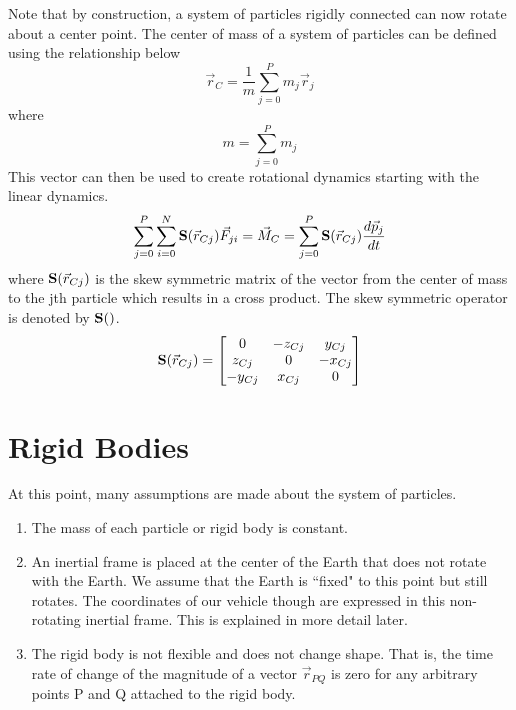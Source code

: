 \documentclass{article}
\begin{document}
Note that by construction, a system of particles rigidly connected can
now rotate about a center point. The center of mass of a system of
particles can be defined using the relationship below
\begin{equation}
\vec{r}_C = \frac{1}{m}\sum\limits_{j=0}^P m_j\vec{r}_{j}
\end{equation}
where
\begin{equation}
m = \sum\limits_{j=0}^P m_j
\end{equation}
This vector can then be used to create rotational dynamics starting
with the linear dynamics.
\begin{equation}
\sum\limits_{j=0}^P \sum\limits_{i=0}^N {\bf S}(\vec{r}_{Cj}) \vec{F}_{ji}  = \vec{M}_C = \sum\limits_{j=0}^P {\bf
  S}(\vec{r}_{Cj}) \frac{d\vec{p}_j}{dt}
\end{equation}
where ${\bf S}(\vec{r}_{Cj})$ is the skew symmetric matrix of the
vector from the center of mass to the jth particle which results in a
cross product. The skew symmetric operator is denoted by ${\bf
  S}()$. 
\begin{equation}
{\bf S}(\vec{r}_{Cj}) = \begin{bmatrix} 0 & -z_{Cj} & y_{Cj} \\ z_{Cj} & 0 &
  -x_{Cj} \\ -y_{Cj} & x_{Cj} & 0 \end{bmatrix}
\end{equation}
\section{Rigid Bodies}

At this point, many assumptions are made about the
system of particles.
\begin{enumerate}
\item The mass of each particle or rigid body is constant.
\item An inertial frame is placed at the center of the Earth that does
  not rotate with the Earth. We assume that the Earth is ``fixed" to
  this point but still rotates. The coordinates of our vehicle
  though are expressed in this non-rotating inertial frame. This is
  explained in more detail later.
\item The rigid body is not flexible and does not change shape. That
  is, the time rate of change of the magnitude of a vector
  $\vec{r}_{PQ}$ is zero for any arbitrary points P and Q attached to
  the rigid body.
\end{enumerate}
\end{document}
